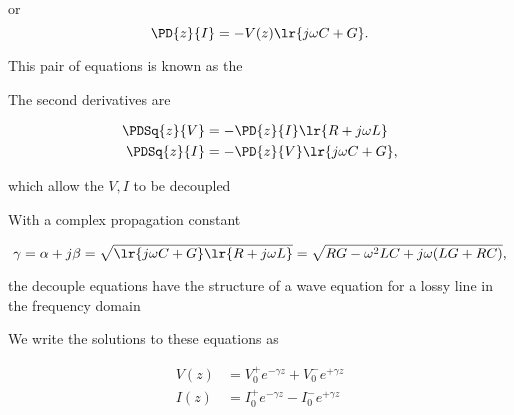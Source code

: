 or
\begin{dmath}\label{eqn:uwaves4TransmissionLines:80}
\PD{z}{I} = -V(z) \lr{ j \omega C + G}.
\end{dmath}

This pair of equations is known as the 


The second derivatives are

\begin{equation}\label{eqn:uwaves4TransmissionLines:120}
\begin{aligned}
\PDSq{z}{V} &= -\PD{z}{I} \lr{ R + j \omega L } \\
\PDSq{z}{I} &= -\PD{z}{V} \lr{ j \omega C + G},
\end{aligned}
\end{equation}

which allow the \( V, I \) to be decoupled

With a complex propagation constant

\begin{dmath}\label{eqn:uwaves4TransmissionLines:160}
\gamma
= \alpha + j \beta 
= \sqrt{ \lr{ j \omega C + G} \lr{ R + j \omega L } } 
= 
\sqrt{ R G - \omega^2 L C + j \omega ( L G + R C ) },
\end{dmath}

the decouple equations have the structure of a wave equation for a lossy line in the frequency domain



We write the solutions to these equations as

\begin{equation}\label{eqn:uwaves4TransmissionLines:200}
\begin{aligned}
V(z) &= V_0^{+} e^{-\gamma z} + V_0^{-} e^{+\gamma z} \\
I(z) &= I_0^{+} e^{-\gamma z} - I_0^{-} e^{+\gamma z} \\
\end{aligned}
\end{equation}

